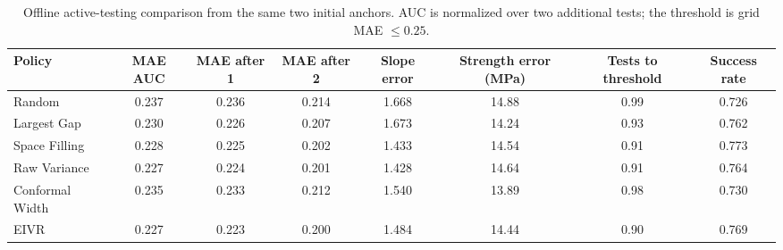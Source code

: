 \begin{table}[t]
\caption{Offline active-testing comparison from the same two initial anchors. AUC is normalized over two additional tests; the threshold is grid MAE $\leq0.25$.}
\label{tab:downstream_active}
\centering
\scriptsize
\setlength{\tabcolsep}{4pt}
\begin{tabular}{lccccccc}
\toprule
Policy & MAE AUC & MAE after 1 & MAE after 2 & Slope error & Strength error (MPa) & Tests to threshold & Success rate \\
\midrule
Random & 0.237 & 0.236 & 0.214 & 1.668 & 14.88 & 0.99 & 0.726 \\
Largest Gap & 0.230 & 0.226 & 0.207 & 1.673 & 14.24 & 0.93 & 0.762 \\
Space Filling & 0.228 & 0.225 & 0.202 & 1.433 & 14.54 & 0.91 & 0.773 \\
Raw Variance & 0.227 & 0.224 & 0.201 & 1.428 & 14.64 & 0.91 & 0.764 \\
Conformal Width & 0.235 & 0.233 & 0.212 & 1.540 & 13.89 & 0.98 & 0.730 \\
EIVR & 0.227 & 0.223 & 0.200 & 1.484 & 14.44 & 0.90 & 0.769 \\
\bottomrule
\end{tabular}
\end{table}
